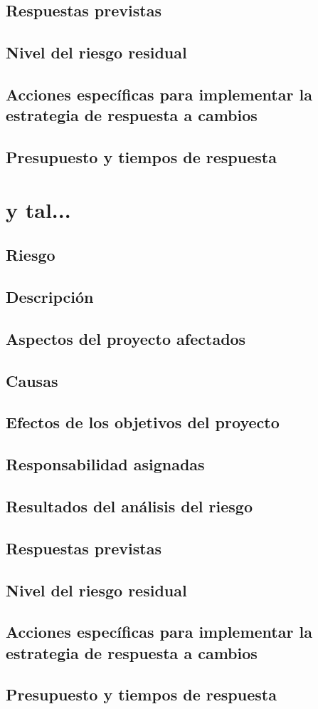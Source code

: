 \documentclass[11pt,a4paper,spanish,twoside]{report}
\begin{document}
\subsection{Respuestas previstas}
\subsection{Nivel del riesgo residual}
\subsection{Acciones específicas para implementar la estrategia de respuesta
a cambios}
\subsection{Presupuesto y tiempos de respuesta}

\section{y tal...}
\subsection{Riesgo}
\subsection{Descripción}
\subsection{Aspectos del proyecto afectados}
\subsection{Causas}
\subsection{Efectos de los objetivos del proyecto}
\subsection{Responsabilidad asignadas}
\subsection{Resultados del análisis del riesgo}
\subsection{Respuestas previstas}
\subsection{Nivel del riesgo residual}
\subsection{Acciones específicas para implementar la estrategia de respuesta
a cambios}
\subsection{Presupuesto y tiempos de respuesta}
\end{document}
